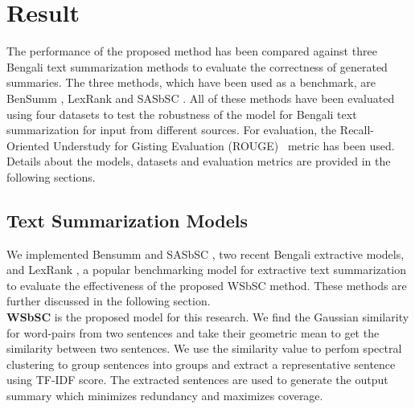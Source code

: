 \documentclass[acmlarge]{acmart}
\begin{document}

\section{Result}\label{sec:result}
The performance of the proposed method has been compared against three Bengali text summarization methods to evaluate the correctness of generated summaries. The three methods, which have been used as a benchmark, are BenSumm \cite{chowdhury-etal-2021-tfidf-clustering}, LexRank \cite{Erkan-lexRank-2004} and SASbSC \cite{roychowdhury-etal-2022-spectral-base}. All of these methods have been evaluated using four datasets to test the robustness of the model for Bengali text summarization for input from different sources. For evaluation, the Recall-Oriented Understudy for Gisting Evaluation (ROUGE)~\cite{lin-2004-rouge} metric has been used. Details about the models, datasets and evaluation metrics are provided in the following sections.

\subsection{Text Summarization Models}\label{subsec:text-summarization-models}
We implemented Bensumm \cite{chowdhury-etal-2021-tfidf-clustering} and SASbSC \cite{roychowdhury-etal-2022-spectral-base}, two recent Bengali extractive models, and LexRank \cite{Erkan-lexRank-2004}, a popular benchmarking model for extractive text summarization to evaluate the effectiveness of the proposed WSbSC method. These methods are further discussed in the following section.\\

\textbf{WSbSC} is the proposed model for this research. We find the Gaussian similarity for word-pairs from two sentences and take their geometric mean to get the similarity between two sentences. We use the similarity value to perfom spectral clustering to group sentences into groups and extract a representative sentence using TF-IDF score. The extracted sentences are used to generate the output summary which minimizes redundancy and maximizes coverage.\\
\end{document}
